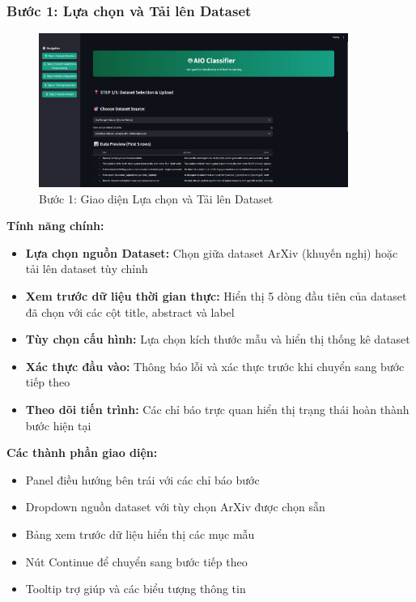 \subsubsection{Bước 1: Lựa chọn và Tải lên Dataset}

\begin{figure}[H]
    \centering
    \includegraphics[width=0.9\textwidth]{image/Step 1.jpg}
    \caption{Bước 1: Giao diện Lựa chọn và Tải lên Dataset}
    \label{fig:step1}
\end{figure}

\textbf{Tính năng chính:}
\begin{itemize}
    \item \textbf{Lựa chọn nguồn Dataset:} Chọn giữa dataset ArXiv (khuyến nghị) hoặc tải lên dataset tùy chỉnh
    \item \textbf{Xem trước dữ liệu thời gian thực:} Hiển thị 5 dòng đầu tiên của dataset đã chọn với các cột title, abstract và label
    \item \textbf{Tùy chọn cấu hình:} Lựa chọn kích thước mẫu và hiển thị thống kê dataset
    \item \textbf{Xác thực đầu vào:} Thông báo lỗi và xác thực trước khi chuyển sang bước tiếp theo
    \item \textbf{Theo dõi tiến trình:} Các chỉ báo trực quan hiển thị trạng thái hoàn thành bước hiện tại
\end{itemize}

\textbf{Các thành phần giao diện:}
\begin{itemize}
    \item Panel điều hướng bên trái với các chỉ báo bước
    \item Dropdown nguồn dataset với tùy chọn ArXiv được chọn sẵn
    \item Bảng xem trước dữ liệu hiển thị các mục mẫu
    \item Nút Continue để chuyển sang bước tiếp theo
    \item Tooltip trợ giúp và các biểu tượng thông tin
\end{itemize}

